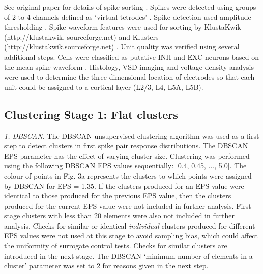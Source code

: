 \documentclass{article}
\begin{document}
See original paper for details of spike sorting \cite{reyes2014laminar}.
Spikes were detected using groups of 2 to 4 channels defined as `virtual tetrodes' \cite{harris2000accuracy, einevoll2012towards}. Spike detection used amplitude-thresholding \cite{gray1995tetrodes}. Spike waveform features were used for sorting by KlustaKwik (http://klustakwik. sourceforge.net) and Klusters (http://klustakwik.sourceforge.net) \cite{harris2000accuracy, hazan2006klusters}. Unit quality was verified using several additional steps. Cells were classified as putative INH and EXC neurons based on the mean spike waveform \cite{sirota2008entrainment, sakata2009laminar, royer2012control}. Histology, VSD imaging and voltage density analysis were used to determine the three-dimensional location of electrodes so that each unit could be assigned to a cortical layer (L2/3, L4, L5A, L5B).



\subsection{Clustering Stage 1: Flat clusters}

\label{methods:flat_clusters}

\textit{1. DBSCAN.} The DBSCAN unsupervised clustering algorithm was used as a first step to detect clusters in  first spike pair response distributions.
The DBSCAN EPS parameter has the effect of varying cluster size. Clustering was performed using the following DBSCAN EPS values sequentially: [0.4, 0.45, ..., 5.0]. The colour of points in Fig. 3a represents the clusters to which points were assigned by DBSCAN for EPS = 1.35. If the clusters produced for an EPS value were identical to those produced for the previous EPS value, then the clusters produced for the current EPS value were not included in further analysis. First-stage clusters with less than 20 elements were also not included in further analysis. Checks for similar or identical \textit{individual} clusters produced for different EPS values were not used at this stage to avoid sampling bias, which could affect the uniformity of surrogate control tests. Checks for similar clusters are introduced in the next stage. The DBSCAN `minimum number of elements in a cluster' parameter was set to 2 for reasons given in the next step.
\end{document}
